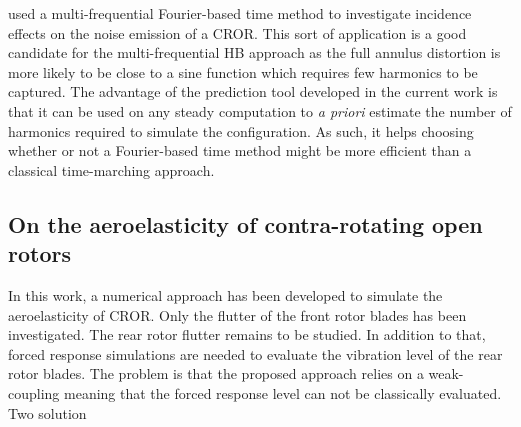 \citet{Ferrante2013} used a multi-frequential Fourier-based time
method to investigate incidence effects on the noise
emission of a CROR. This sort of application is a good candidate
for the multi-frequential HB approach as the full annulus
distortion is more likely to be close to a sine function which
requires few harmonics to be captured. The advantage of the
prediction tool developed in the current work is that
it can be used on any steady computation to \emph{a priori}
estimate the number of harmonics required to simulate the
configuration. As such, it helps choosing whether or not
a Fourier-based time method might be more efficient than
a classical time-marching approach.


\subsection*{On the aeroelasticity of contra-rotating open rotors}

In this work, a numerical approach has been developed to
simulate the aeroelasticity of CROR. Only the flutter of the
front rotor blades has been investigated. The rear rotor
flutter remains to be studied. In addition to that, forced
response simulations are needed to evaluate the vibration
level of the rear rotor blades. The problem is that the
proposed approach relies on a weak-coupling meaning
that the forced response level can not be classically evaluated.
Two solution
